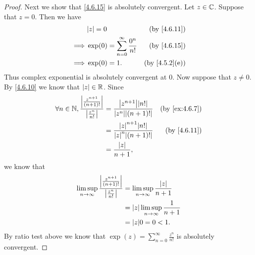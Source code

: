 \begin{proof}
  Next we show that \cref{4.6.15} is absolutely convergent.
  Let \(z \in \mathbb{C}\).
  Suppose that \(z = 0\).
  Then we have
  \begin{align*}
             & \abs{z} = 0                                  & \text{(by \cref{4.6.11})}   \\
    \implies & \exp(0) = \sum_{n = 0}^\infty \frac{0^n}{n!} & \text{(by \cref{4.6.15})}   \\
    \implies & \exp(0) = 1.                                 & \text{(by \cref{4.5.2}(e))}
  \end{align*}
  Thus complex exponential is absolutely convergent at \(0\).
  Now suppose that \(z \neq 0\).
  By \cref{4.6.10} we know that \(\left\lvert z\right\rvert \in \mathbb{R}\).
  Since
  \begin{align*}
    \forall n \in \N, \frac{\abs{\frac{z^{n + 1}}{(n + 1)!}}}{\abs{\frac{z^n}{n!}}} & = \frac{\abs{z^{n + 1}} \abs{n!}}{\abs{z^n} \abs{(n + 1)!}} & \text{(by \cref{ex:4.6.7})} \\
                                                                                    & = \frac{\abs{z}^{n + 1} \abs{n!}}{\abs{z}^n \abs{(n + 1)!}} & \text{(by \cref{4.6.11})}   \\
                                                                                    & = \frac{\abs{z}}{n + 1},
  \end{align*}
  we know that
  \begin{align*}
    \limsup_{n \to \infty} \frac{\abs{\frac{z^{n + 1}}{(n + 1)!}}}{\abs{\frac{z^n}{n!}}} & = \limsup_{n \to \infty} \frac{\abs{z}}{n + 1}   \\
                                                                                         & = \abs{z} \limsup_{n \to \infty} \frac{1}{n + 1} \\
                                                                                         & = \abs{z} 0 = 0 < 1.
  \end{align*}
  By ratio test above we know that \(\exp(z) = \sum_{n = 0}^\infty \frac{z^n}{n!}\) is absolutely convergent.


\end{proof}
